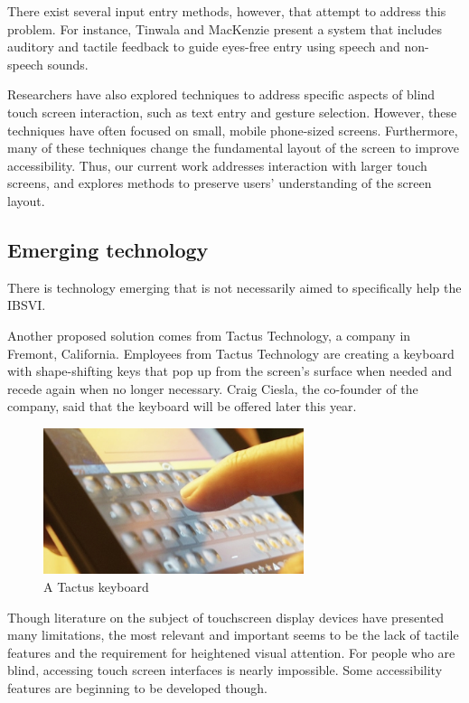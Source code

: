 \documentclass{article}
\begin{document}
There exist several input entry methods, however, that attempt to address this problem. For instance, Tinwala and MacKenzie present a system that includes auditory and tactile feedback to guide eyes-free entry using speech and non-speech sounds. \cite{Tinwala:2010:ETE:1868914.1868972} 

  Researchers have also explored techniques to 
address specific aspects of blind touch screen interaction, 
such as text entry and gesture selection\cite{conf/chi/KaneWL11}. 
However, these techniques have often focused on small, 
mobile phone-sized screens. Furthermore, many of these 
techniques change the fundamental layout of the screen to 
improve accessibility. Thus, our current work addresses 
interaction with larger touch screens, and explores methods 
to preserve users’ understanding of the screen layout. 

\clearpage
\subsection{Emerging technology}
There is technology emerging that is not necessarily aimed to specifically help the IBSVI.

Another proposed solution comes from Tactus Technology, a company in Fremont, California. Employees from Tactus Technology are creating a keyboard with shape-shifting keys that pop up from the screen's surface when needed and recede again when no longer necessary.\cite{Tactus} Craig Ciesla, the co-founder of the company, said that the keyboard will be offered later this year. 

\begin{figure}[ht]
\centering
\includegraphics[width=3in]{tactus-keyboard.jpg} 
\caption{A Tactus keyboard}
\label{figure-sample}
\end{figure}
Though literature on the subject of touchscreen display devices have presented many limitations, the most relevant and important seems to be the lack of tactile features and the requirement for heightened visual attention. For people who are blind, accessing touch screen interfaces is nearly impossible. Some accessibility features are beginning to be developed though.
\end{document}
